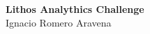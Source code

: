 \documentclass[letterpaper,11pt]{article}
\begin{document}
	\noindent

	
	\vspace{0cm}  %
	
	\begin{center}
		{\LARGE \textbf{Lithos Analythics Challenge}}\\
		{\Large Ignacio Romero Aravena}
	\end{center}
	
	
	\printbibliography
	
\end{document}
